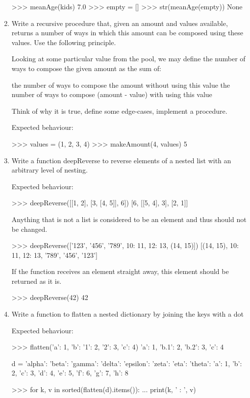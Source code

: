 \documentclass[]{article}
\begin{document}
\begin{enumerate}
>>> meanAge(kids)
7.0
>>> empty = []
>>> str(meanAge(empty))
None

\item
Write a recursive procedure that, given an amount and values available,  returns a number of ways in which this amount can be composed using these values. Use the following principle.

Looking at some particular value from the pool, we may define the number of  ways to compose the given amount as the sum of:

     the number of ways to compose the amount without using this value
    the number of ways to compose (amount - value) with using this value


Think of why it is true, define some edge-cases, implement a procedure.

Expected behaviour: 

>>> values = (1, 2, 3, 4)
>>> makeAmount(4, values)
5

\item
Write a function deepReverse to reverse elements of a nested list with an arbitrary level of nesting.

Expected behaviour:

>>> deepReverse([[1, 2], [3, [4, 5]], 6])
[6, [[5, 4], 3], [2, 1]]


Anything that is not a list is considered to be an element and thus should not be changed.

>>> deepReverse(['123', '456', '789', {10: 11, 12: 13}, (14, 15)])
[(14, 15), {10: 11, 12: 13}, '789', '456', '123']


If the function receives an element straight away, this element should be returned as it is.

>>> deepReverse(42)
42

\item

Write a function to flatten a nested dictionary by joining the keys with a dot

Expected behaviour:

>>> flatten({'a': 1, 'b': {'1': 2, '2': 3}, 'c': 4})
{'a': 1, 'b.1': 2, 'b.2': 3, 'c': 4}

d = {'alpha': 
      {'beta': 
        {'gamma': 
          {'delta': 
            {'epsilon': 
              {'zeta': 
                {'eta': 
                  {'theta': 
                    {'a': 1, 'b': 2, 'c': 3, 'd': 4, 'e': 5, 'f': 6, 'g': 7, 'h': 8}}}}}}}}}
                    
>>> for k, v in sorted(flatten(d).items()): 
... print(k, ' : ', v) 


\end{enumerate}
\end{document}
